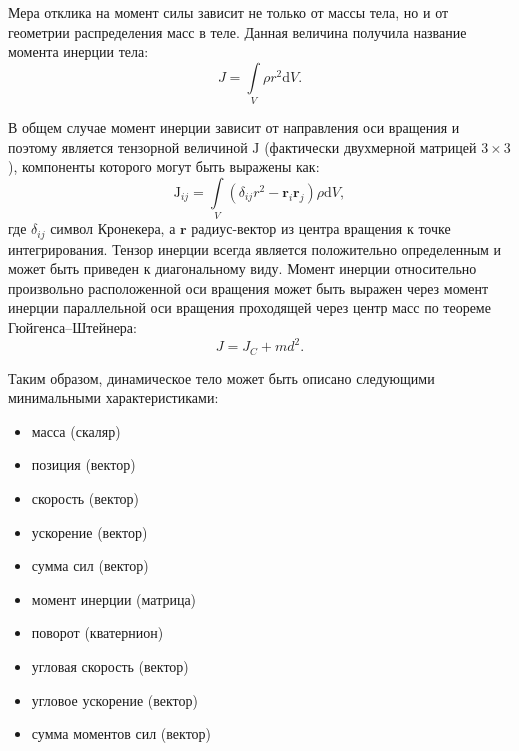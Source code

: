Мера отклика на момент силы зависит не только от массы тела, но и от геометрии распределения
масс в теле. Данная величина получила название момента инерции тела:
\begin{equation}
 J=\int\limits_{V} \rho r^2\mathrm{d}V.
\end{equation}

В общем случае момент инерции зависит от направления оси вращения и поэтому является тензорной
величиной $\mathrm{J}$ (фактически двухмерной матрицей \begin{math}3\times3\end{math}), компоненты которого могут
быть выражены как:
\begin{equation}
 \mathrm{J}_{ij} = \int\limits_{V} (\delta_{ij}r^2 - \mathbf{r}_i \mathbf{r}_j) \rho \mathrm{d}V,
\end{equation}
где $\delta_{ij}$ символ Кронекера, а $\mathbf{r}$ радиус-вектор из центра вращения к точке интегрирования.
Тензор инерции всегда является положительно определенным и может быть приведен к диагональному виду. Момент
инерции относительно произвольно расположенной оси вращения может быть выражен через момент инерции параллельной
оси вращения проходящей через центр масс по теореме Гюйгенса--Штейнера:
\begin{equation}
 J=J_C+md^2.
\end{equation}


Таким образом, динамическое тело может быть описано
следующими минимальными характеристиками:
\begin{itemize}
  \item масса (скаляр)
  \item позиция (вектор)
  \item скорость (вектор)
  \item ускорение (вектор) %
  \item сумма сил (вектор) %
  \item момент инерции (матрица)
  \item поворот (кватернион)
  \item угловая скорость (вектор)
  \item угловое ускорение (вектор) %
  \item сумма моментов сил (вектор) %
\end{itemize}
